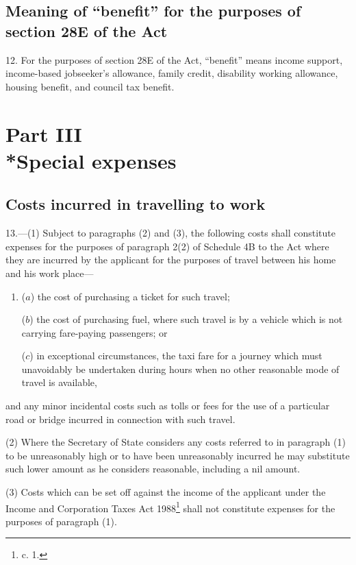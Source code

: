 \documentclass[a4paper]{article}
\newcommand{\parthead}{}
\begin{document}
\subsection[12. Meaning of “benefit” for the purposes of section 28E of the Act]{Meaning of “benefit” for the purposes of section 28E of the Act}

12.  For the purposes of section 28E of the Act, “benefit” means income support, income-based jobseeker’s allowance, family credit, disability working allowance, housing benefit, and council tax benefit.

\section[Part III --- Special expenses]{Part III\\*Special expenses}

\subsection[13. Costs incurred in travelling to work]{Costs incurred in travelling to work}

\renewcommand\parthead{--- Part III}

13.—(1) Subject to paragraphs (2) and (3), the following costs shall constitute expenses for the purposes of paragraph 2(2) of Schedule 4B to the Act where they are incurred by the applicant for the purposes of travel between his home and his work place—
\begin{enumerate}\item[]
($a$) the cost of purchasing a ticket for such travel;

($b$) the cost of purchasing fuel, where such travel is by a vehicle which is not carrying fare-paying passengers; or

($c$) in exceptional circumstances, the taxi fare for a journey which must unavoidably be undertaken during hours when no other reasonable mode of travel is available,
\end{enumerate}
and any minor incidental costs such as tolls or fees for the use of a particular road or bridge incurred in connection with such travel.

(2) Where the Secretary of State considers any costs referred to in paragraph (1) to be unreasonably high or to have been unreasonably incurred he may substitute such lower amount as he considers reasonable, including a nil amount.

(3) Costs which can be set off against the income of the applicant under the Income and Corporation Taxes Act 1988\footnote{ c. 1.} shall not constitute expenses for the purposes of paragraph (1).
\end{document}
